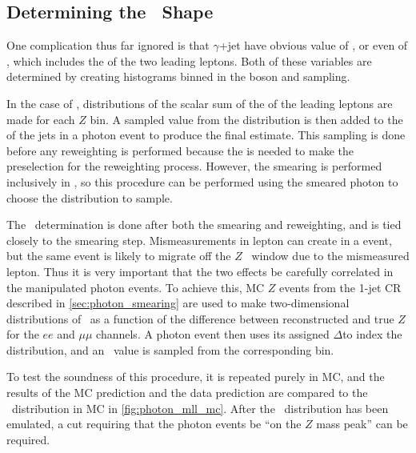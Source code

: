 \subsection{Determining the \mll~Shape}
\label{sec:photon_mll}

One complication thus far ignored is that $\gamma$+jet have obvious value of \mll, or even of \HT, which includes the \pt of the two leading leptons. Both of these variables are determined by creating histograms binned in the boson \pt and sampling. 

In the case of \HT, distributions of the scalar sum of the \pt of the leading leptons are made for each $Z$ \pt bin. A sampled value from the distribution is then added to the \HT of the jets in a photon event to produce the final estimate. This sampling is done before any reweighting is performed because the \HT is needed to make the preselection for the reweighting process. However, the smearing is performed inclusively in \HT, so this procedure can be performed using the smeared photon \pt to choose the distribution to sample. 

The \mll~determination is done after both the smearing and reweighting, and is tied closely to the smearing step. Mismeasurements in lepton \pt can create \met in a \dyjets event, but the same event is likely to migrate off the $Z$ \mll~window due to the mismeasured lepton. Thus it is very important that the two effects be carefully correlated in the manipulated photon events. To achieve this, \ac{MC} $Z$ events from the 1-jet \ac{CR} described in \autoref{sec:photon_smearing} are used to make two-dimensional distributions of \mll~as a function of the difference between reconstructed and true $Z$ \pt for the $ee$ and $\mu\mu$ channels. A photon event then uses its assigned $\Delta$\pt to index the distribution, and an \mll~value is sampled from the corresponding bin. 

To test the soundness of this procedure, it is repeated purely in \ac{MC}, and the results of the \ac{MC} prediction and the data prediction are compared to the \mll~distribution in \dyjets \ac{MC} in \autoref{fig:photon_mll_mc}. After the \mll~distribution has been emulated, a cut requiring that the photon events be ``on the $Z$ mass peak'' can be required.


